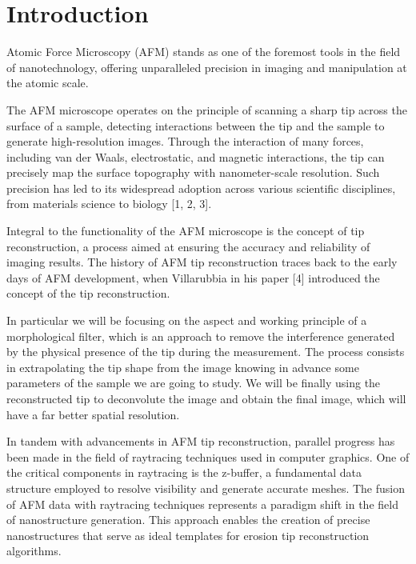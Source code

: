 \documentclass{article}
\begin{document}
\newpage
\section{Introduction}\label{sec:Introduction}

Atomic Force Microscopy (AFM) stands as one of the foremost tools in the field of nanotechnology, offering unparalleled precision in imaging and manipulation at the atomic scale. 

The AFM microscope operates on the principle of scanning a sharp tip across the surface of a sample, detecting interactions between the tip and the sample to generate high-resolution images. Through the interaction of many forces, including van der Waals, electrostatic, and magnetic interactions, the tip can precisely map the surface topography with nanometer-scale resolution. Such precision has led to its widespread adoption across various scientific disciplines, from materials science to biology [1, 2, 3].

Integral to the functionality of the AFM microscope is the concept of tip reconstruction, a process aimed at ensuring the accuracy and reliability of imaging results. The history of AFM tip reconstruction traces back to the early days of AFM development, when Villarubbia in his paper [4] introduced the concept of the tip reconstruction.

In particular we will be focusing on the aspect and working principle of a morphological filter, which is an approach to remove the interference generated by the physical presence of the tip during the measurement. The process consists in extrapolating the tip shape from the image knowing in advance some parameters of the sample we are going to study. We will be finally using the reconstructed tip to deconvolute the image and obtain the final image, which will have a far better spatial resolution. 

In tandem with advancements in AFM tip reconstruction, parallel progress has been made in the field of raytracing techniques used in computer graphics. One of the critical components in raytracing is the z-buffer, a fundamental data structure employed to resolve visibility and generate accurate meshes. The fusion of AFM data with raytracing techniques represents a paradigm shift in the field of nanostructure generation. This approach enables the creation of precise nanostructures that serve as ideal templates for erosion tip reconstruction algorithms.

\newpage
\end{document}
